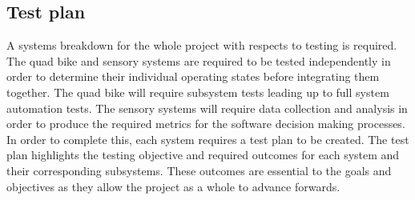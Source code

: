\documentclass[main.tex]{subfiles}
\begin{document}
\begin{appendices}






\section{Test plan}
A systems breakdown for the whole project with respects to testing is required. The quad bike and sensory systems are required to be tested independently in order to determine their individual operating states before integrating them together. The quad bike will require subsystem tests leading up to full system automation tests. The sensory systems will require data collection and analysis in order to produce the required metrics for the software decision making processes. In order to complete this, each system requires a test plan to be created. The test plan highlights the testing objective and required outcomes for each system and their corresponding subsystems. These outcomes are essential to the goals and objectives as they allow the project as a whole to advance forwards.


\end{appendices}
\end{document}
